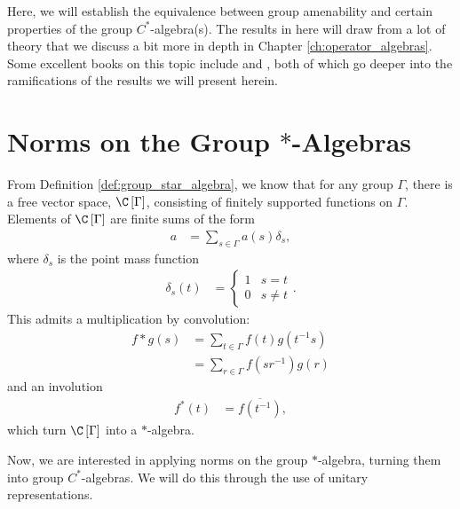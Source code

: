 Here, we will establish the equivalence between group amenability and certain properties of the group $C^{\ast}$-algebra(s). The results in here will draw from a lot of theory that we discuss a bit more in depth in Chapter \ref{ch:operator_algebras}. Some excellent books on this topic include \cite{brown_and_ozawa} and \cite{completely_bounded_maps_and_operator_algebras}, both of which go deeper into the ramifications of the results we will present herein.
\section{Norms on the Group \texorpdfstring{$\ast$-Algebras}{*-Algebras}}%
From Definition \ref{def:group_star_algebra}, we know that for any group $\Gamma$, there is a free vector space, $\C\left[ \Gamma \right]$, consisting of finitely supported functions on $\Gamma$. Elements of $\C\left[ \Gamma \right]$ are finite sums of the form
\begin{align*}
  a &= \sum_{s\in\Gamma}a(s)\delta_s,
\end{align*}
where $\delta_s$ is the point mass function
\begin{align*}
  \delta_s\left( t \right) &= \begin{cases}
    1 & s = t\\
    0 & s\neq t
  \end{cases}.
\end{align*}
This admits a multiplication by convolution:
\begin{align*}
  f\ast g(s) &= \sum_{t\in\Gamma}f(t)g\left( t^{-1}s \right)\\
              &= \sum_{r\in\Gamma}f\left( sr^{-1} \right)g\left( r \right)
\end{align*}
and an involution
\begin{align*}
  f^{\ast}\left( t \right) &= \overline{f\left( t^{-1} \right)},
\end{align*}
which turn $\C\left[ \Gamma \right]$ into a $\ast$-algebra.\newline

Now, we are interested in applying norms on the group $\ast$-algebra, turning them into group $C^{\ast}$-algebras. We will do this through the use of unitary representations.\newline

